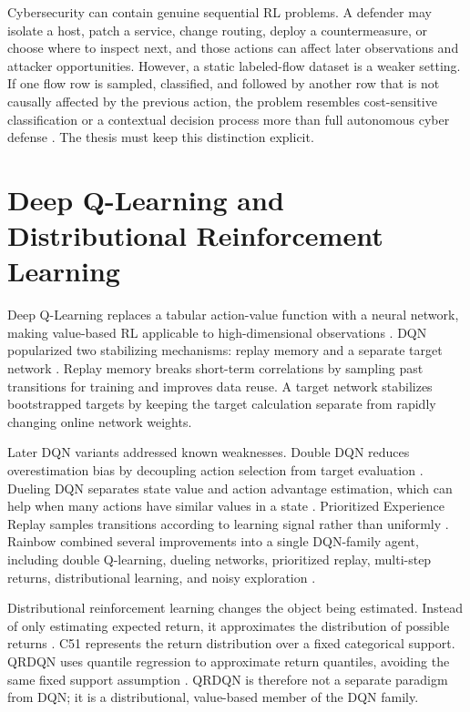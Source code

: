 Cybersecurity can contain genuine sequential RL problems. A defender may isolate a host, patch a service, change routing, deploy a countermeasure, or choose where to inspect next, and those actions can affect later observations and attacker opportunities. However, a static labeled-flow dataset is a weaker setting. If one flow row is sampled, classified, and followed by another row that is not causally affected by the previous action, the problem resembles cost-sensitive classification or a contextual decision process more than full autonomous cyber defense \parencite{Levine2020OfflineRL,Fujimoto2019BCQ}. The thesis must keep this distinction explicit.

\section{Deep Q-Learning and Distributional Reinforcement Learning}

Deep Q-Learning replaces a tabular action-value function with a neural network, making value-based RL applicable to high-dimensional observations \parencite{Mnih2015DQN}. DQN popularized two stabilizing mechanisms: replay memory and a separate target network \parencite{Mnih2015DQN}. Replay memory breaks short-term correlations by sampling past transitions for training and improves data reuse. A target network stabilizes bootstrapped targets by keeping the target calculation separate from rapidly changing online network weights.

Later DQN variants addressed known weaknesses. Double DQN reduces overestimation bias by decoupling action selection from target evaluation \parencite{VanHasselt2016DoubleDQN}. Dueling DQN separates state value and action advantage estimation, which can help when many actions have similar values in a state \parencite{Wang2016DuelingDQN}. Prioritized Experience Replay samples transitions according to learning signal rather than uniformly \parencite{Schaul2016PER}. Rainbow combined several improvements into a single DQN-family agent, including double Q-learning, dueling networks, prioritized replay, multi-step returns, distributional learning, and noisy exploration \parencite{Hessel2018Rainbow}.

Distributional reinforcement learning changes the object being estimated. Instead of only estimating expected return, it approximates the distribution of possible returns \parencite{Bellemare2017DistributionalRL}. C51 represents the return distribution over a fixed categorical support. QRDQN uses quantile regression to approximate return quantiles, avoiding the same fixed support assumption \parencite{Dabney2018QRDQN}. QRDQN is therefore not a separate paradigm from DQN; it is a distributional, value-based member of the DQN family.

